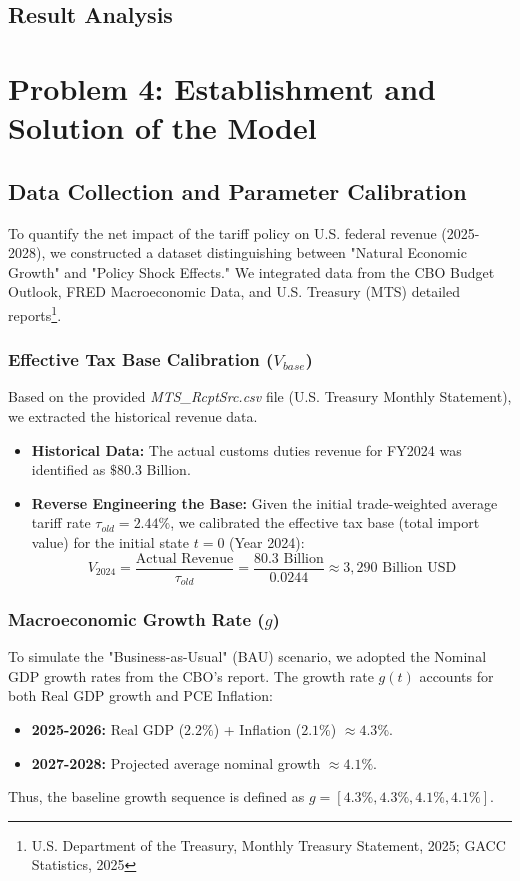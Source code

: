 \documentclass{apmcmthesis}
\begin{document}
\subsection{Result Analysis}


\newpage
\section{Problem 4: Establishment and Solution of the Model}

\subsection{Data Collection and Parameter Calibration}
To quantify the net impact of the tariff policy on U.S. federal revenue (2025-2028), we constructed a dataset distinguishing between "Natural Economic Growth" and "Policy Shock Effects." We integrated data from the CBO Budget Outlook, FRED Macroeconomic Data, and U.S. Treasury (MTS) detailed reports\footnote{\cite{USTreasury2025} U.S. Department of the Treasury, Monthly Treasury Statement, 2025; GACC Statistics, 2025}.

\subsubsection{Effective Tax Base Calibration ($V_{base}$)}
Based on the provided \textit{MTS\_RcptSrc.csv} file (U.S. Treasury Monthly Statement), we extracted the historical revenue data.
\begin{itemize}
    \item \textbf{Historical Data:} The actual customs duties revenue for FY2024 was identified as $\$80.3$ Billion.
    \item \textbf{Reverse Engineering the Base:} Given the initial trade-weighted average tariff rate $\tau_{old} = 2.44\%$, we calibrated the effective tax base (total import value) for the initial state $t=0$ (Year 2024):
    \begin{equation}
        V_{2024} = \frac{\text{Actual Revenue}}{\tau_{old}} = \frac{80.3 \text{ Billion}}{0.0244} \approx 3,290 \text{ Billion USD}
    \end{equation}
\end{itemize}

\subsubsection{Macroeconomic Growth Rate ($g$)}
To simulate the "Business-as-Usual" (BAU) scenario, we adopted the Nominal GDP growth rates from the CBO's report. The growth rate $g(t)$ accounts for both Real GDP growth and PCE Inflation:
\begin{itemize}
    \item \textbf{2025-2026:} Real GDP ($2.2\%$) + Inflation ($2.1\%$) $\approx 4.3\%$.
    \item \textbf{2027-2028:} Projected average nominal growth $\approx 4.1\%$.
\end{itemize}
Thus, the baseline growth sequence is defined as $g = [4.3\%, 4.3\%, 4.1\%, 4.1\%]$.
\end{document}
